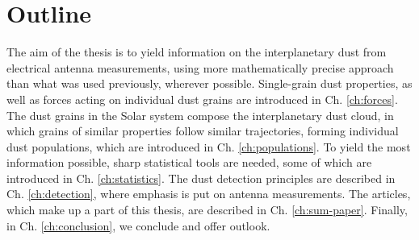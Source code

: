 \section{Outline}

The aim of the thesis is to yield information on the interplanetary dust from electrical antenna measurements, using more mathematically precise approach than what was used previously, wherever possible. Single-grain dust properties, as well as forces acting on individual dust grains are introduced in Ch. \ref{ch:forces}. The dust grains in the Solar system compose the interplanetary dust cloud, in which grains of similar properties follow similar trajectories, forming individual dust populations, which are introduced in Ch. \ref{ch:populations}. To yield the most information possible, sharp statistical tools are needed, some of which are introduced in Ch. \ref{ch:statistics}. The dust detection principles are described in Ch. \ref{ch:detection}, where emphasis is put on antenna measurements. The articles, which make up a part of this thesis, are described in Ch. \ref{ch:sum-paper}. Finally, in Ch. \ref{ch:conclusion}, we conclude and offer outlook.